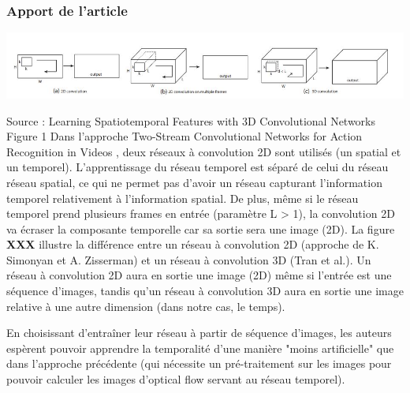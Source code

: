\documentclass[11pt]{article}
\begin{document}
\subsubsection{Apport de l'article}
\label{sec:org6e71902}
\begin{center}
\includegraphics[width=.9\linewidth]{3D_vs_2_stream.JPG}
\end{center}
Source : Learning Spatiotemporal Features with 3D Convolutional Networks Figure 1
Dans l'approche Two-Stream Convolutional Networks for Action Recognition in Videos \cite{DBLP:journals/corr/SimonyanZ14}, deux réseaux à convolution 2D sont utilisés (un spatial et un temporel).
L'apprentissage du réseau temporel est séparé de celui du réseau réseau spatial, ce qui ne permet pas d'avoir un réseau capturant l'information temporel relativement à l'information spatial.
De plus, même si le réseau temporel prend plusieurs frames en entrée (paramètre L > 1), la convolution 2D va écraser la composante temporelle car sa sortie sera une image (2D).
La figure \textbf{XXX} illustre la différence entre un réseau à convolution 2D (approche de K. Simonyan et A. Zisserman) et un réseau à convolution 3D (Tran et al.). Un réseau à convolution 2D aura en sortie une image (2D) même si l'entrée est une séquence d'images, tandis qu'un réseau à convolution 3D aura en sortie une image relative à une autre dimension (dans notre cas, le temps).

En choisissant d'entraîner leur réseau à partir de séquence d'images, les auteurs espèrent pouvoir apprendre la temporalité d'une manière "moins artificielle" que dans l'approche précédente (qui nécessite un pré-traitement sur les images pour pouvoir calculer les images d'optical flow servant au réseau temporel).
\end{document}
